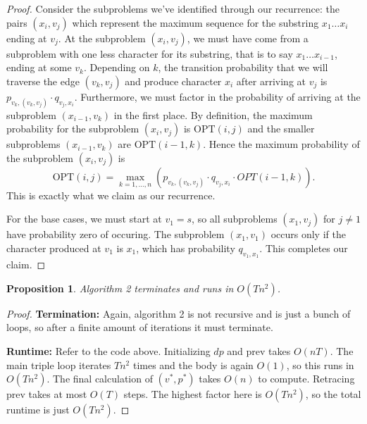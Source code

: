 \documentclass[10pt]{article}
\newtheorem{proposition}[lemma]{Proposition}
\newcommand{\OPT}{\text{OPT}}
\begin{document}
\begin{proof}
  Consider the subproblems we've identified through our recurrence: the pairs \((x_i, v_j)\) which represent the maximum sequence for the substring \(x_1 \ldots x_i\) ending at \(v_j\). At the subproblem \((x_i, v_j)\), we must have come from a subproblem with one less character for its substring, that is to say \(x_1 \ldots x_{i - 1}\), ending at some \(v_k\). Depending on \(k\), the transition probability that we will traverse the edge \((v_k, v_j)\) and produce character \(x_i\) after arriving at \(v_j\) is \(p_{v_k, (v_k, v_j)} \cdot q_{v_j, x_i}\). Furthermore, we must factor in the probability of arriving at the subproblem \((x_{i - 1}, v_k)\) in the first place. By definition, the maximum probability for the subproblem \((x_i, v_j)\) is \(\OPT(i, j)\) and the smaller subproblems \((x_{i- 1}, v_k)\) are \(\OPT(i - 1, k)\). Hence the maximum probability of the subproblem \((x_i, v_j)\) is 
  \[\OPT(i, j) = \max_{k = 1, \ldots, n}\left(p_{v_k, (v_k, v_j)} \cdot q_{v_j, x_i} \cdot OPT(i - 1, k)\right).\]
  This is exactly what we claim as our recurrence. 
  
  For the base cases, we must start at \(v_1 = s\), so all subproblems \((x_1, v_j)\) for \(j \neq 1\) have probability zero of occuring. The subproblem \((x_1, v_1)\) occurs only if the character produced at \(v_1\) is \(x_1\), which has probability \(q_{v_1, x_1}\). This completes our claim.
\end{proof}

\begin{proposition}
  Algorithm 2 terminates and runs in \(O(Tn^2)\).
\end{proposition}

\begin{proof}
  \textbf{Termination:} Again, algorithm 2 is not recursive and is just a bunch of loops, so after a finite amount of iterations it must terminate.

  \textbf{Runtime:} Refer to the code above. Initializing \(dp\) and prev takes \(O(nT)\). The main triple loop iterates \(Tn^2\) times and the body is again \(O(1)\), so this runs in \(O(Tn^2)\). The final calculation of \((v^*, p^*)\) takes \(O(n)\) to compute. Retracing prev takes at most \(O(T)\) steps. The highest factor here is \(O(Tn^2)\), so the total runtime is just \(O(Tn^2)\).
\end{proof}

  \medskip
\end{document}
